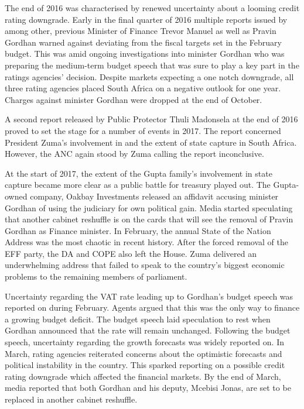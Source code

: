 \documentclass[11pt,preprint, authoryear]{elsarticle}
\numberwithin{equation}{section}
\numberwithin{figure}{section}
\numberwithin{table}{section}
\begin{document}
The end of 2016 was characterised by renewed uncertainty about a looming
credit rating downgrade. Early in the final quarter of 2016 multiple
reports issued by among other, previous Minister of Finance Trevor
Manuel as well as Pravin Gordhan warned against deviating from the
fiscal targets set in the February budget. This was amid ongoing
investigations into minister Gordhan who was preparing the medium-term
budget speech that was sure to play a key part in the ratings agencies'
decision. Despite markets expecting a one notch downgrade, all three
rating agencies placed South Africa on a negative outlook for one year.
Charges against minister Gordhan were dropped at the end of October.

A second report released by Public Protector Thuli Madonsela at the end
of 2016 proved to set the stage for a number of events in 2017. The
report concerned President Zuma's involvement in and the extent of state
capture in South Africa. However, the ANC again stood by Zuma calling
the report inconclusive.

At the start of 2017, the extent of the Gupta family's involvement in
state capture became more clear as a public battle for treasury played
out. The Gupta-owned company, Oakbay Investments released an affidavit
accusing minister Gordhan of using the judiciary for own political gain.
Media started speculating that another cabinet reshuffle is on the cards
that will see the removal of Pravin Gordhan as Finance minister. In
February, the annual State of the Nation Address was the most chaotic in
recent history. After the forced removal of the EFF party, the DA and
COPE also left the House. Zuma delivered an underwhelming address that
failed to speak to the country's biggest economic problems to the
remaining members of parliament.

Uncertainty regarding the VAT rate leading up to Gordhan's budget speech
was reported on during February. Agents argued that this was the only
way to finance a growing budget deficit. The budget speech laid
speculation to rest when Gordhan announced that the rate will remain
unchanged. Following the budget speech, uncertainty regarding the growth
forecasts was widely reported on. In March, rating agencies reiterated
concerns about the optimistic forecasts and political instability in the
country. This sparked reporting on a possible credit rating downgrade
which affected the financial markets. By the end of March, media
reported that both Gordhan and his deputy, Mcebisi Jonas, are set to be
replaced in another cabinet reshuffle.
\end{document}
